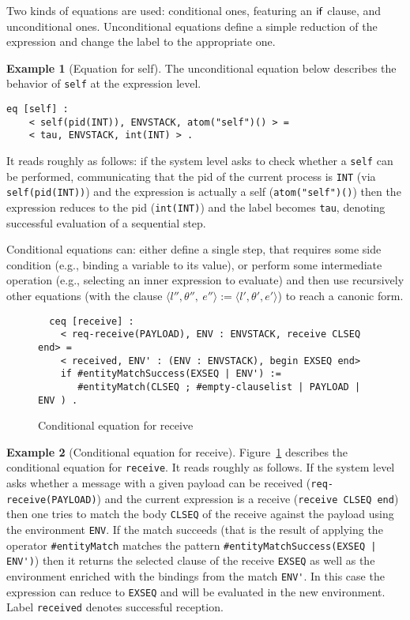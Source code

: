 \documentclass{article}[12pt,a4paper]
\theoremstyle{definition}
\newtheorem{example}{Example}[section]
\begin{document}
Two kinds of equations are used: conditional ones, featuring an
$\mathsf{if}$ clause, and unconditional ones. Unconditional equations
define a simple reduction of the expression and change the label to
the appropriate one.

\begin{example}[Equation for self]
The unconditional equation below describes the behavior of \verb+self+ at the expression level.
\begin{verbatim}
eq [self] :
    < self(pid(INT)), ENVSTACK, atom("self")() > =
    < tau, ENVSTACK, int(INT) > .
\end{verbatim}
It reads roughly as follows: if the system level asks to check whether a \verb+self+ can be performed, communicating that the pid of the current process is \verb+INT+ (via \verb+self(pid(INT))+) and the expression is actually a self (\verb+atom("self")()+) then the expression reduces to the pid (\verb+int(INT)+) and the label becomes \verb+tau+, denoting successful evaluation of a sequential step.
\end{example}

Conditional equations can: either define a single step, that requires
some side condition (e.g., binding a variable to its value), or
perform some intermediate operation (e.g., selecting an inner
expression to evaluate) and then use recursively other equations (with the clause $\langle
    l'',\theta'',~e'' \rangle := \langle l',\theta',e'\rangle$) to
reach a canonic form.

\begin{figure}[t]
  \centering
\begin{verbatim}
  ceq [receive] :
    < req-receive(PAYLOAD), ENV : ENVSTACK, receive CLSEQ end> =
    < received, ENV' : (ENV : ENVSTACK), begin EXSEQ end>
    if #entityMatchSuccess(EXSEQ | ENV') := 
       #entityMatch(CLSEQ ; #empty-clauselist | PAYLOAD | ENV ) .
\end{verbatim}
  \caption{Conditional equation for receive}
  \label{fig:eq-rec}
\end{figure}

\begin{example}[Conditional equation for receive]\label{ex:eqrec}
Figure~\ref{fig:eq-rec} describes the conditional equation for
\verb+receive+. It reads roughly as follows. If the system level asks whether
a message with a given payload can be received
(\verb+req-receive(PAYLOAD)+) and the current expression is a receive
(\verb+receive CLSEQ end+) then one tries to match the body
\verb+CLSEQ+ of the receive against the payload using the environment \verb+ENV+. If the match succeeds (that is the result of applying the operator \verb+#entityMatch+ matches the pattern \verb+#entityMatchSuccess(EXSEQ | ENV')+) then it returns the selected clause of the receive \verb+EXSEQ+ as well as the environment enriched with the bindings from the match
 \verb+ENV'+. In this case the expression can reduce to \verb+EXSEQ+ and will be evaluated in the new environment. Label \verb+received+ denotes successful reception.
\end{example}
\end{document}
